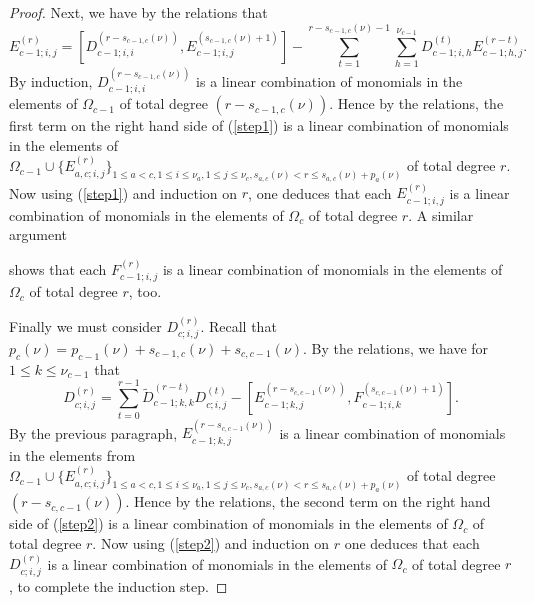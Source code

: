 \documentclass[twoside,12pt,reqno]{amsart}
\begin{document}
\begin{proof}
Next, we have by the relations that
\begin{equation}\label{step1}
E_{c-1;i,j}^{(r)} = 
[D_{c-1;i,i}^{(r-s_{c-1,c}(\nu))},
E_{c-1;i,j}^{(s_{c-1,c}(\nu)+1)}]
-\sum_{t=1}^{r-s_{c-1,c}(\nu)-1}
\sum_{h=1}^{\nu_{c-1}}
D_{c-1;i,h}^{(t)} E_{c-1;h,j}^{(r-t)}.
\end{equation}
By induction, $D_{c-1;i,i}^{(r-s_{c-1,c}(\nu))}$
is a linear combination
of monomials in the elements of $\Omega_{c-1}$ of total degree
$(r-s_{c-1,c}(\nu))$. Hence by the relations, the first term on the right
hand side of (\ref{step1})
is a linear combination of monomials in the elements of
$\Omega_{c-1} \cup \{E_{a,c;i,j}^{(r)}\}_{1 \leq a < c, 
1 \leq i \leq \nu_a,
1 \leq j \leq \nu_c, 
s_{a,c}(\nu) < r \leq 
s_{a,c}(\nu)+p_a(\nu)}$
of total degree $r$.
Now using (\ref{step1}) and induction on $r$,
one deduces that 
each $E_{c-1;i,j}^{(r)}$
is a linear combination of monomials in the elements of $\Omega_c$
of total degree $r$.
A similar argument 
\iffalse
using the relation
\begin{equation}\label{step11}
F_{c-1;i,j}^{(r)} = 
[F_{c-1;i,j}^{(s_{c,c-1}(\nu)+1)}, D_{c-1;j,j}^{(r-s_{c,c-1}(\nu))}]
-\sum_{t=1}^{r-s_{c,c-1}(\nu)-1}
\sum_{h=1}^{\nu_{c-1}}
F_{c-1;i,h}^{(r-t)}D_{c-1;h,j}^{(t)}
\end{equation}
\fi
shows that each $F_{c-1;i,j}^{(r)}$
is a linear combination of monomials in the elements of $\Omega_c$
of total degree $r$, too.

Finally we must consider $D_{c;i,j}^{(r)}$. 
Recall that
$p_c(\nu) = p_{c-1}(\nu)+s_{c-1,c}(\nu)+
s_{c,c-1}(\nu)$.
By the relations, we have 
for $1 \leq k \leq \nu_{c-1}$ that
\begin{equation}\label{step2}
D_{c;i,j}^{(r)} = \sum_{t=0}^{r-1} 
\widetilde{D}_{c-1;k,k}^{(r-t)}
D_{c;i,j}^{(t)} - [E_{c-1;k,j}^{(r-s_{c,c-1}(\nu))},
F_{c-1;i,k}^{(s_{c,c-1}(\nu)+1)}].
\end{equation}
By the previous paragraph, $E_{c-1;k,j}^{(r-s_{c,c-1}(\nu))}$ is a linear combination of monomials in the elements from $\Omega_{c-1}
\cup \{E_{a,c;i,j}^{(r)}\}_{1 \leq a < 
c, 1 \leq i \leq \nu_a,
1 \leq j \leq \nu_c, s_{a,c}(\nu) < r \leq s_{a,c}(\nu)+p_a(\nu)}$
of total degree $(r - s_{c,c-1}(\nu))$. Hence by the relations, 
the second term on the right hand side of (\ref{step2}) is a linear
combination of monomials in the elements of $\Omega_c$
of total degree $r$.
Now using (\ref{step2}) and induction on $r$ one deduces
that each 
$D_{c;i,j}^{(r)}$ is a linear combination of monomials in the elements
of $\Omega_c$ of total degree $r$, to complete the induction step.
\end{proof}
\end{document}
